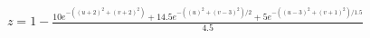 \documentclass[preview]{standalone}
\begin{document}
\begin{align*}
z = 1 - \frac{10e^{-((u+2)^2+(v+2)^2)} + 14.5e^{-((u)^2+(v-3)^2)/2} + 5e^{-((u-3)^2+(v+1)^2)/1.5}}{4.5}
\end{align*}
\end{document}
